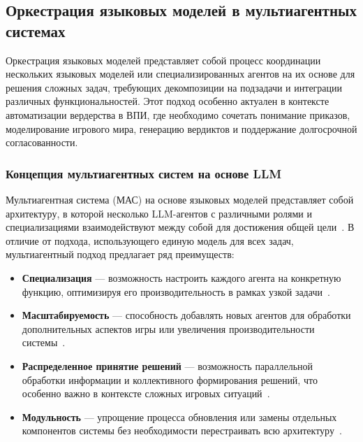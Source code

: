 \subsection{Оркестрация языковых моделей в мультиагентных системах}

Оркестрация языковых моделей представляет собой процесс координации нескольких языковых моделей или специализированных агентов на их основе для решения сложных задач, требующих декомпозиции на подзадачи и интеграции различных функциональностей. Этот подход особенно актуален в контексте автоматизации вердерства в ВПИ, где необходимо сочетать понимание приказов, моделирование игрового мира, генерацию вердиктов и поддержание долгосрочной согласованности.

\subsubsection{Концепция мультиагентных систем на основе LLM}

Мультиагентная система (МАС) на основе языковых моделей представляет собой архитектуру, в которой несколько LLM-агентов с различными ролями и специализациями взаимодействуют между собой для достижения общей цели~\cite{xi2023rise}. В отличие от подхода, использующего единую модель для всех задач, мультиагентный подход предлагает ряд преимуществ:

\begin{itemize}
    \item \textbf{Специализация} — возможность настроить каждого агента на конкретную функцию, оптимизируя его производительность в рамках узкой задачи~\cite{wu2023autogen}.

    \item \textbf{Масштабируемость} — способность добавлять новых агентов для обработки дополнительных аспектов игры или увеличения производительности системы~\cite{park2023generative}.

    \item \textbf{Распределенное принятие решений} — возможность параллельной обработки информации и коллективного формирования решений, что особенно важно в контексте сложных игровых ситуаций~\cite{hong2023metagpt}.

    \item \textbf{Модульность} — упрощение процесса обновления или замены отдельных компонентов системы без необходимости перестраивать всю архитектуру~\cite{wu2023autogen}.
\end{itemize}

